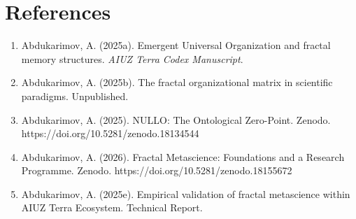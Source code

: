 \documentclass[12pt,a4paper]{article}
\begin{document}
\section*{References}
\begin{enumerate}
    \item Abdukarimov, A. (2025a). Emergent Universal Organization and fractal memory structures. \textit{AIUZ Terra Codex Manuscript}.
    \item Abdukarimov, A. (2025b). The fractal organizational matrix in scientific paradigms. Unpublished.
    \item Abdukarimov, A. (2025). NULLO: The Ontological Zero-Point. Zenodo. https://doi.org/10.5281/zenodo.18134544
    \item Abdukarimov, A. (2026). Fractal Metascience: Foundations and a Research Programme. Zenodo. https://doi.org/10.5281/zenodo.18155672
    \item Abdukarimov, A. (2025e). Empirical validation of fractal metascience within AIUZ Terra Ecosystem. Technical Report.
\end{enumerate}
\end{document}
